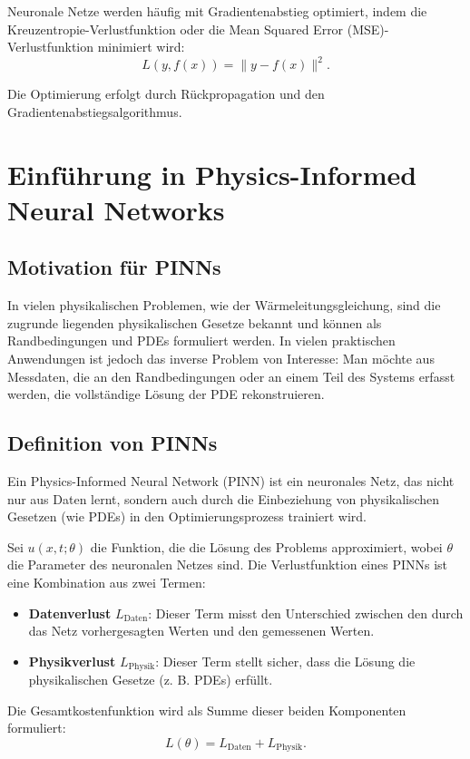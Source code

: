 Neuronale Netze werden häufig mit Gradientenabstieg optimiert, indem die Kreuzentropie-Verlustfunktion oder die Mean Squared Error (MSE)-Verlustfunktion minimiert wird:
\[
L(y, f(x)) = \|y - f(x)\|^2.
\]

Die Optimierung erfolgt durch Rückpropagation und den Gradientenabstiegsalgorithmus.

\section{Einführung in Physics-Informed Neural Networks}

\subsection{Motivation für PINNs}
In vielen physikalischen Problemen, wie der Wärmeleitungsgleichung, sind die zugrunde liegenden physikalischen Gesetze bekannt und können als Randbedingungen und PDEs formuliert werden. In vielen praktischen Anwendungen ist jedoch das inverse Problem von Interesse: Man möchte aus Messdaten, die an den Randbedingungen oder an einem Teil des Systems erfasst werden, die vollständige Lösung der PDE rekonstruieren.

\subsection{Definition von PINNs}
Ein Physics-Informed Neural Network (PINN) ist ein neuronales Netz, das nicht nur aus Daten lernt, sondern auch durch die Einbeziehung von physikalischen Gesetzen (wie PDEs) in den Optimierungsprozess trainiert wird.

Sei $u(x, t; \theta)$ die Funktion, die die Lösung des Problems approximiert, wobei $\theta$ die Parameter des neuronalen Netzes sind. Die Verlustfunktion eines PINNs ist eine Kombination aus zwei Termen:

\begin{itemize}
	\item \textbf{Datenverlust} $L_\text{Daten}$: Dieser Term misst den Unterschied zwischen den durch das Netz vorhergesagten Werten und den gemessenen Werten.
	\item \textbf{Physikverlust} $L_\text{Physik}$: Dieser Term stellt sicher, dass die Lösung die physikalischen Gesetze (z. B. PDEs) erfüllt.
\end{itemize}

Die Gesamtkostenfunktion wird als Summe dieser beiden Komponenten formuliert:
\[
L(\theta) = L_\text{Daten} + L_\text{Physik}.
\]


